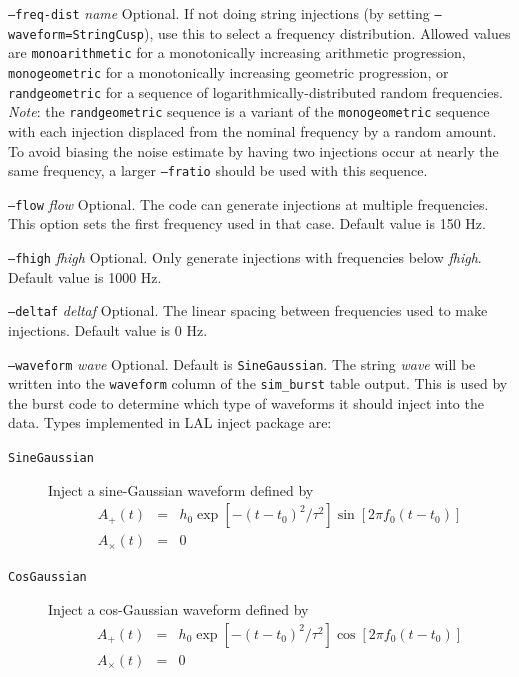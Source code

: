 \documentclass[10pt]{article}
\newcommand{\option}[1]{\texttt{#1}}
\newcommand{\parm}[1]{\textit{#1}}
\newenvironment{entry}%
{\begin{list}{}{\renewcommand{\makelabel}[1]%
{\parbox[b]{\labelwidth}{\makebox[0pt][l]{\textbf{##1}}\\}}%
\setlength{\labelwidth}{1em}%
\setlength{\labelsep}{1em}%
\setlength{\leftmargin}{2em}%
\setlength{\topsep}{\medskipamount}%
\setlength{\itemsep}{\medskipamount}%
\setlength{\parsep}{\medskipamount}%
\setlength{\listparindent}{0pt}}}
{\end{list}}
\begin{document}
\begin{entry}
\begin{entry}
\item[\option{--freq-dist} \parm{name}]
Optional.  If not doing string injections (by setting
\option{--waveform=StringCusp}), use this to select a frequency
distribution.  Allowed values are \option{monoarithmetic} for a
monotonically increasing arithmetic progression, \option{monogeometric} for
a monotonically increasing geometric progression, or \option{randgeometric}
for a sequence of logarithmically-distributed random frequencies.
\emph{Note}:  the \option{randgeometric} sequence is a variant of the
\option{monogeometric} sequence with each injection displaced from the
nominal frequency by a random amount.  To avoid biasing the noise estimate
by having two injections occur at nearly the same frequency, a larger
\option{--fratio} should be used with this sequence.

\item[\option{--flow} \parm{flow}]
Optional.  The code can generate injections at multiple frequencies.  This
option sets the first frequency used in that case.  Default value is 150
Hz.

\item[\option{--fhigh} \parm{fhigh}]
Optional.  Only generate injections with frequencies below \parm{fhigh}.
Default value is 1000 Hz.

\item[\option{--deltaf} \parm{deltaf}]
Optional.  The linear spacing between frequencies used to make
injections.  Default value is 0 Hz.

\item[\option{--waveform} \parm{wave}]
Optional.  Default is \texttt{SineGaussian}.   The string \parm{wave} will
be written into the \texttt{waveform} column of the \texttt{sim\_burst}
table output. This is used by the burst code to determine which type of
waveforms it should inject into the data.  Types implemented in LAL inject
package are:
\begin{description}
\item[\texttt{SineGaussian}]  Inject a sine-Gaussian waveform defined by
\begin{eqnarray}
A_+(t) &=& h_0 \exp[ - (t-t_0)^2/ \tau^2 ] \sin[ 2 \pi f_0 (t-t_0)] \\
A_\times(t) &=& 0
\end{eqnarray}

\item[\texttt{CosGaussian}]  Inject a cos-Gaussian waveform defined by
\begin{eqnarray}
A_+(t) &=& h_0 \exp[ - (t-t_0)^2/ \tau^2 ] \cos[ 2 \pi f_0 (t-t_0)] \\
A_\times(t) &=& 0
\end{eqnarray}
\end{description}


\end{entry}
\end{entry}
\end{document}
